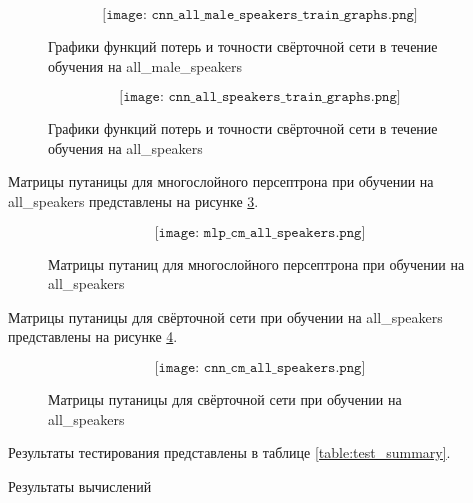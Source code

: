 \begin{figure}[H]
	\[\texttt{[image: cnn\_all\_male\_speakers\_train\_graphs.png]}\]
	\caption{Графики функций потерь и точности свёрточной сети в течение обучения на all\_male\_speakers}
	\label{fig:cnn_all_male_speakers_train_graphs}
\end{figure}

\begin{figure}[H]
	\[\texttt{[image: cnn\_all\_speakers\_train\_graphs.png]}\]
	\caption{Графики функций потерь и точности свёрточной сети в течение обучения на all\_speakers}
	\label{fig:cnn_all_speakers_train_graphs}
\end{figure}

Матрицы путаницы для многослойного персептрона при обучении на all\_speakers представлены на рисунке \ref{fig:mlp_cm_all_speakers}.

\begin{figure}[H]
	\[\texttt{[image: mlp\_cm\_all\_speakers.png]}\]
	\caption{Матрицы путаниц для многослойного персептрона при обучении на all\_speakers}
	\label{fig:mlp_cm_all_speakers}
\end{figure}


Матрицы путаницы для свёрточной сети при обучении на all\_speakers представлены на рисунке \ref{fig:cnn_cm_all_speakers}.

\begin{figure}[H]
	\[\texttt{[image: cnn\_cm\_all\_speakers.png]}\]
	\caption{Матрицы путаницы для свёрточной сети при обучении на all\_speakers}
	\label{fig:cnn_cm_all_speakers}
\end{figure}

Результаты тестирования представлены в таблице \ref{table:test_summary}. 

\begin{table}[H]
\small
\centering
{}
\caption{Результаты вычислений}
\label{table:test_summary}
\end{table}